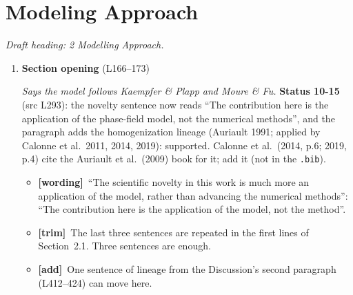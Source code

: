 \documentclass[11pt]{article}
\newcommand{\Pg}[3]{\item \textbf{#1} {\small(#2)}\par\textit{#3}}
\newcommand{\tG}{\textcolor{stale}{\textbf{[wording]}}\ }
\newcommand{\tT}{\textcolor{cut}{\textbf{[trim]}}\ }
\newcommand{\tA}{\textcolor{have}{\textbf{[add]}}\ }
\newcommand{\add}[1]{\textcolor{revX}{#1}}
\begin{document}
\section{Modeling Approach}
\textit{Draft heading: 2 Modelling Approach.}
\begin{enumerate}
\Pg{Section opening}{L166--173}{Says the model follows Kaempfer \& Plapp and Moure \& Fu.}
  \add{\textbf{Status 10-15} (src L293): the novelty sentence now reads
  ``The contribution here is the application of the phase-field model, not
  the numerical methods'', and the paragraph adds the homogenization
  lineage (Auriault 1991; applied by Calonne et al.\ 2011, 2014, 2019):
  supported. Calonne et al.\ (2014, p.6; 2019, p.4) cite the Auriault et
  al.\ (2009) book for it; add it (not in the \texttt{.bib}).}
  \begin{itemize}
  \item \tG ``The scientific novelty in this work is much more an application
    of the model, rather than advancing the numerical methods'': ``The
    contribution here is the application of the model, not the method''.
  \item \tT The last three sentences are repeated in the first lines of
    Section~2.1. Three sentences are enough.
  \item \tA One sentence of lineage from the Discussion's second paragraph
    (L412--424) can move here.
  \end{itemize}
\end{enumerate}
\end{document}
